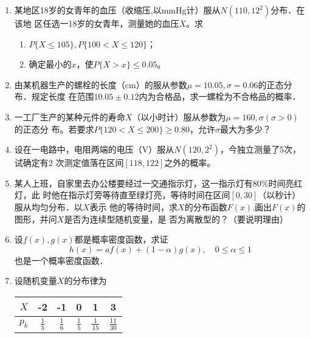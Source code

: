 \documentclass[10pt,a4paper]{article}
\begin{document}
\begin{enumerate}
    \item 某地区18岁的女青年的血压（收缩压,以mmHg计）服从$N(110,12^2)$分布．在该地
    区任选一18岁的女青年，测量她的血压$X$。求
    \begin{enumerate}
        \item $P\{X\leq 105\},P\{100<X\leq 120\}$；
        \item 确定最小的$x$，使$P\{X>x\}\leq 0.05$。
    \end{enumerate}


    \item 由某机器生产的螺栓的长度（cm）的服从参数$\mu=10.05,\sigma=0.06$的正态分布．规定长度
    在范围$10.05\pm 0.12$内为合格品，求一螺栓为不合格品的概率．


    \item 一工厂生产的某种元件的寿命$X$（以小时计）服从参数为$\mu=160,\sigma(\sigma >0)$的正态分
    布。若要求$P\{120<X\leq 200\}\geq 0.80$，允许$\sigma$最大为多少？



    \item 设在一电路中，电阻两端的电压（V）服从$N(120,2^2)$，今独立测量了5次，试确定有2
    次测定值落在区间$[118,122]$之外的概率。


    \item 某人上班，自家里去办公楼要经过一交通指示灯，这一指示灯有80\%时间亮红灯，此
    时他在指示灯旁等待直至绿灯亮，等待时间在区间$[0,30]$（以秒计）服从均匀分布．以$X$表示
    他的等待时间，求$X$的分布函数$F(x)$.画出$F(x)$的图形，并问$X$是否为连续型随机变量，是
    否为离散型的？（要说明理由）


    \item 设$f(x),g(x)$都是概率密度函数，求证
    $$h(x)=af(x)+(1-\alpha)g(x),\quad 0\leq \alpha \leq 1$$
    也是一个概率密度函数．


    \item 设随机变量$X$的分布律为   
    \renewcommand{\arraystretch}{1.5}
    \begin{table}[H]\centering
        \begin{tabular}{c|ccccc}
        
            $X$   & -2            & -1            & 0             & 1              & 3               \\ \hline
        $p_k$ & $\displaystyle{\frac{1}{5}}$ & $\displaystyle{\frac{1}{6}}$ & $\displaystyle{\frac{1}{5}}$ & $\displaystyle{\frac{1}{15}}$ & $\displaystyle{\frac{11}{30}}$ 
        \end{tabular}
    \end{table}
 


\end{enumerate}
\end{document}
